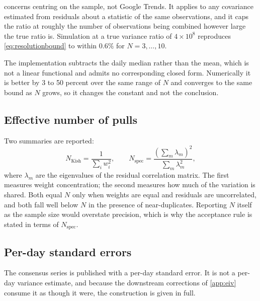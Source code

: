 \documentclass[12pt,a4paper,oneside]{article}
\begin{document}
\begin{remark}
 concerns centring on the sample, not Google Trends. It
applies to any covariance estimated from residuals about a statistic of the same
observations, and it caps the ratio at roughly the number of observations being
combined however large the true ratio is. Simulation at a true variance ratio of
$4\times 10^{8}$ reproduces \eqref{eq:resolutionbound} to within $0.6\%$ for
$N=3,\dots,10$.
\end{remark}

\begin{remark}
The implementation subtracts the daily median rather than the mean, which is not
a linear functional and admits no corresponding closed form. Numerically it is
better by 3 to 50 percent over the same range of $N$ and converges to the same
bound as $N$ grows, so it changes the constant and not the conclusion.
\end{remark}

\subsection{Effective number of pulls}

Two summaries are reported:
\begin{equation}
N_{\text{Kish}}=\frac{1}{\sum_i w_i^2},
\qquad
N_{\text{spec}}=\frac{\left(\sum_{m}\lambda_m\right)^2}{\sum_{m}\lambda_m^2},
\end{equation}
where $\lambda_m$ are the eigenvalues of the residual correlation matrix. The
first measures weight concentration; the second measures how much of the
variation is shared. Both equal $N$ only when weights are equal and residuals
are uncorrelated, and both fall well below $N$ in the presence of
near-duplicates. Reporting $N$ itself as the sample size would overstate
precision, which is why the acceptance rule is stated in terms of
$N_{\text{spec}}$.

\subsection{Per-day standard errors}\label{app:dailyse}

The consensus series is published with a per-day standard error. It is not a
per-day variance estimate, and because the downstream corrections of
\cref{app:eiv} consume it as though it were, the construction is given in full.
\end{document}
